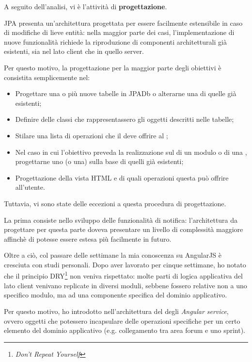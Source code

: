 A seguito dell'analisi, vi è l'attività di \textbf{progettazione}.

JPA presenta un'architettura progettata per essere facilmente estensibile in
caso di modifiche di lieve entità: nella maggior parte dei casi,
l'implementazione di nuove funzionalità richiede la riproduzione di componenti
architetturali già esistenti, sia nel lato client che in quello server.

Per questo motivo, la progettazione per la maggior parte degli obiettivi è
consistita semplicemente nel:

\begin{itemize}
\item Progettare una o più nuove tabelle in JPADb o alterarne una di quelle
  già esistenti;
\item Definire delle classi che rappresentassero gli oggetti descritti nelle
  tabelle;
\item Stilare una lista di operazioni che il \BKEND{} deve offrire al \FREND{};
\item Nel caso in cui l'obiettivo preveda la realizzazione sul \FREND{} di un
  modulo o di una , progettarne uno (o una) sulla base di
  quelli già esistenti;
\item Progettazione della vista HTML e di quali operazioni questa può offrire
  all'utente.
\end{itemize}

Tuttavia, vi sono state delle eccezioni a questa procedura di progettazione.

La prima consiste nello sviluppo delle funzionalità di notifica: l'architettura
da progettare per questa parte doveva presentare un livello di complessità
maggiore affinchè di potesse essere estesa più facilmente in futuro.

Oltre a ciò, col passare delle settimane la mia conoscenza su AngularJS è
cresciuta con studi personali. Dopo aver lavorato per cinque settimane, ho
notato che il principio DRY\footnote{\emph{Don't Repeat Yourself}} non veniva
rispettato: molte parti di logica applicativa del lato client venivano
replicate in diversi moduli, sebbene fossero relative non a uno specifico
modulo, ma ad una componente specifica del dominio applicativo.

Per questo motivo, ho introdotto nell'architettura del \FREND{} degli
\emph{Angular service}, ovvero oggetti che potessero incapsulare delle
operazioni specifiche per un certo elemento del dominio applicativo (e.g.
collegamento tra area forum e uno sprint).

